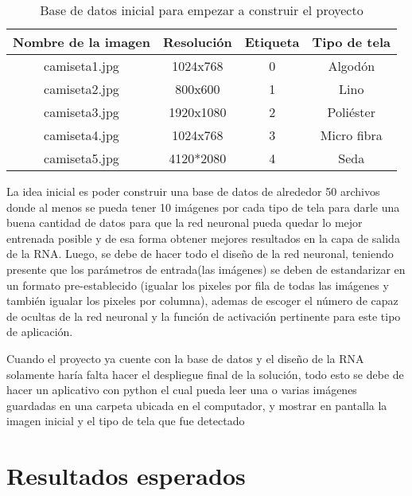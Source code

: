 \documentclass{article}
\begin{document}
\vspace{1cm}
\begin{table}[h]
    \centering
    \begin{tabular}{||c c c c||} 
        \hline
        \textbf{Nombre de la imagen} & \textbf{Resolución} & \textbf{Etiqueta} & \textbf{Tipo de tela} \\ [0.9ex] 
        \hline\hline
        camiseta1.jpg & 1024x768 & 0 & Algodón \\ 
        \hline
        camiseta2.jpg & 800x600 & 1 & Lino \\
        \hline
        camiseta3.jpg & 1920x1080 & 2 & Poliéster \\
        \hline
        camiseta4.jpg & 1024x768 & 3 & Micro fibra \\
        \hline
        camiseta5.jpg & 4120*2080 & 4 & Seda \\ [2ex] 
        \hline
    \end{tabular}
    \caption{Base de datos inicial para empezar a construir el proyecto}
    \label{table:1}
\end{table}
\vspace{1cm}

La idea inicial es poder construir una base de datos de alrededor 50 archivos donde al menos se pueda tener 10 imágenes por cada tipo
de tela para darle una buena cantidad de datos para que la red neuronal pueda quedar lo mejor entrenada posible y de esa forma
obtener mejores resultados en la capa de salida de la RNA. Luego, se debe de hacer todo el diseño de la red neuronal, 
teniendo presente que los parámetros de entrada(las imágenes) se deben de estandarizar en un formato pre-establecido (igualar los pixeles por fila de todas las imágenes 
y también igualar los pixeles por columna), ademas de escoger el número de capaz de ocultas de la red neuronal y la función de activación pertinente para
este tipo de aplicación.

Cuando el proyecto ya cuente con la base de datos y el diseño de la RNA solamente haría falta hacer el despliegue final de la solución, todo esto se debe de hacer
un aplicativo con python el cual pueda leer una o varias imágenes guardadas en una carpeta ubicada en el computador, y mostrar en pantalla la imagen inicial
y el tipo de tela que fue detectado

\section{Resultados esperados}
\end{document}
